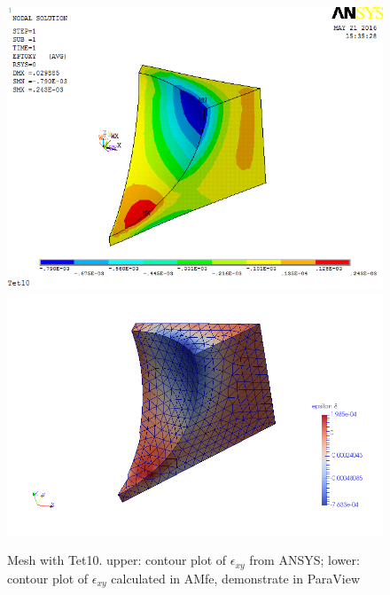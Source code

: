 \begin{figure}[htbp]
	\begin{center}
		\includegraphics[width=13cm,clip]{Tet10_Exy.png} 		
		\includegraphics[width=13cm,clip]{Tet10_Exy_P.png} 		
		\caption{Mesh with Tet10. upper: contour plot of $\epsilon_{xy}$ from ANSYS; lower: contour plot of $\epsilon_{xy}$ calculated in AMfe, demonstrate in ParaView} \label{fig: Tet10_Exy}
	\end{center}
\end{figure}
\clearpage 

